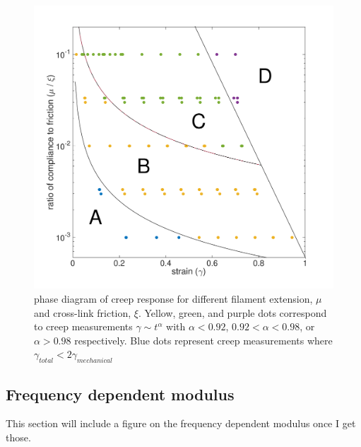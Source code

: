\begin{figure}[h!]
\centering
\includegraphics[width=\hsize]{slippage/phase_diag}
\caption{\label{fig:phase_diag} phase diagram of creep response for different filament extension, $\mu$ and cross-link friction, $\xi$.  Yellow, green, and purple dots correspond to creep measurements $\gamma \sim t^\alpha$ with $\alpha<0.92$, $0.92<\alpha<0.98$, or $\alpha>0.98$ respectively.  Blue dots represent creep measurements where $\gamma_{total} < 2\gamma_{mechanical}$}
\end{figure}

\subsection{Frequency dependent modulus}
This section will include a figure on the frequency dependent modulus once I get those.

